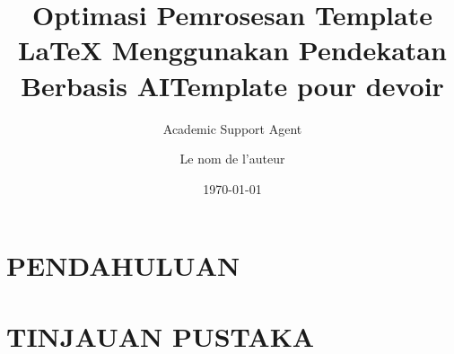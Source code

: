 \documentclass{article}
\title{Optimasi Pemrosesan Template LaTeX Menggunakan Pendekatan Berbasis AI}
\author{Academic Support Agent}
\date{\today}
\begin{document}
\maketitle

\begin{abstract}

\end{abstract}

\chapter{PENDAHULUAN}


\chapter{TINJAUAN PUSTAKA}


\usepackage{natbib} %
\usepackage[french]{babel}	%
\usepackage[utf8]{inputenc}	%
\usepackage[T1]{fontenc}	%
\usepackage{setspace}
\usepackage[margin=2.5cm]{geometry} %
\title{Template pour devoir}%
\author{Le nom de l'auteur} %

\addto{\captionsfrench}{\renewcommand{\refname}{Bibliographie}} %
\usepackage[nottoc]{tocbibind} %


\newcommand{\titre}{Titre du travail}
\newcommand{\auteurs}{Auteurs}
\newcommand{\matricules}{123 456 789}
\newcommand{\destinataire}{Destinataire}
\newcommand{\cours}{ABC-1234}
\end{document}
